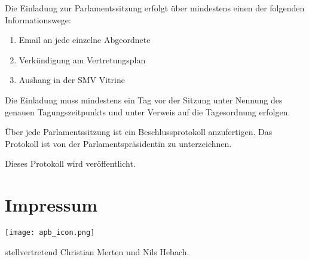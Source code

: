 \documentclass{sasbase}
\begin{document}
\begin{article}[Einladung]
    \item Die Einladung zur Parlamentssitzung erfolgt über mindestens einen der folgenden
        Informationswege:
        \begin{enumerate}
            \item Email an jede einzelne Abgeordnete
            \item Verkündigung am Vertretungsplan
            \item Aushang in der SMV Vitrine
        \end{enumerate}
    \item Die Einladung muss mindestens ein Tag vor der Sitzung unter Nennung des genauen
        Tagungszeitpunkts und unter Verweis auf die Tagesordnung erfolgen.
\end{article}
\begin{article}[Protokoll]
\item Über jede Parlamentssitzung ist ein Beschlussprotokoll anzufertigen. Das Protokoll ist von der Parlamentspräsidentin zu unterzeichnen.
\item Dieses Protokoll wird ver\"{o}ffentlicht.	
\end{article}
\section{Impressum}
\begin{minipage}{0.4\linewidth}
\texttt{[image: apb\_icon.png]}
\end{minipage}
\begin{minipage}{0.5\linewidth}
{\raggedright stellvertretend Christian Merten und Nils Hebach.}
\end{minipage}
\end{document}
